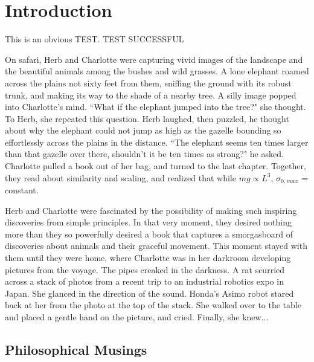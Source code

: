 \chapter{Introduction}
\label{sec:Introduction}

This is an obvious TEST. 
TEST SUCCESSFUL

On safari, Herb and Charlotte were capturing vivid images of the landscape and the beautiful animals among the bushes and wild grasses. A lone elephant roamed across the plains not sixty feet from them, sniffing the ground with its robust trunk, and making its way to the shade of a nearby tree. A silly image popped into Charlotte's mind. ``What if the elephant jumped into the tree?" she thought. To Herb, she repeated this question. Herb laughed, then puzzled, he thought about why the elephant could not jump as high as the gazelle bounding so effortlessly across the plains in the distance. ``The elephant seems ten times larger than that gazelle over there, shouldn't it be ten times as strong?" he asked. Charlotte pulled a book \cite{mcmahon84} out of her bag, and turned to the last chapter. Together, they read about similarity and scaling, and realized that while $mg \propto L^{3}$, $\sigma_{0, max}$ = constant.

Herb and Charlotte were fascinated by the possibility of making such inspiring discoveries from simple principles. In that very moment, they desired nothing more than they so powerfully desired a book that captures a smorgasboard of discoveries about animals and their graceful movement. This moment stayed with them until they were home, where Charlotte was in her darkroom developing pictures from the voyage. The pipes creaked in the darkness. A rat scurried across a stack of photos from a recent trip to an industrial robotics expo in Japan. She glanced in the direction of the sound. Honda's Asimo robot stared back at her from the photo at the top of the stack. She walked over to the table and placed a gentle hand on the picture, and cried. Finally, she knew...

\section{Philosophical Musings}

